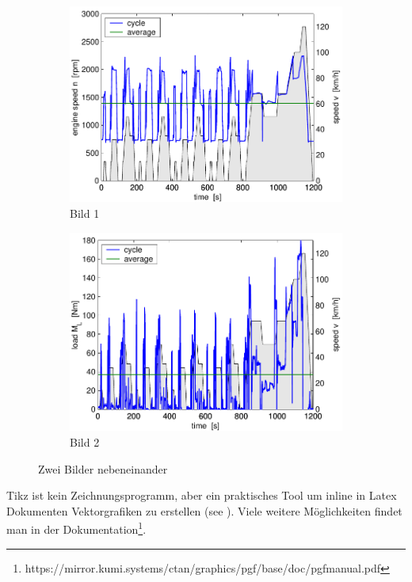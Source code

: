 \begin{figure}[hbp]
  \begin{subfigure}[t]{0.48\textwidth}
    \includegraphics[width = \textwidth]{images/cycle_we.pdf}
    \caption{Bild 1}
    \label{pics:cycle:1}
  \end{subfigure}
  \hfill
  \begin{subfigure}[t]{0.48\textwidth}
    \includegraphics[width = \textwidth]{images/cycle_ml.pdf}
    \caption{Bild 2}
    \label{pics:cycle:2}
  \end{subfigure}
  \caption{Zwei Bilder nebeneinander}
  \label{pics:cycle}
\end{figure}

Tikz ist kein Zeichnungsprogramm, aber ein praktisches Tool um inline in Latex Dokumenten Vektorgrafiken zu erstellen (see ). Viele weitere Möglichkeiten findet man in der Dokumentation\footnote{https://mirror.kumi.systems/ctan/graphics/pgf/base/doc/pgfmanual.pdf}.

